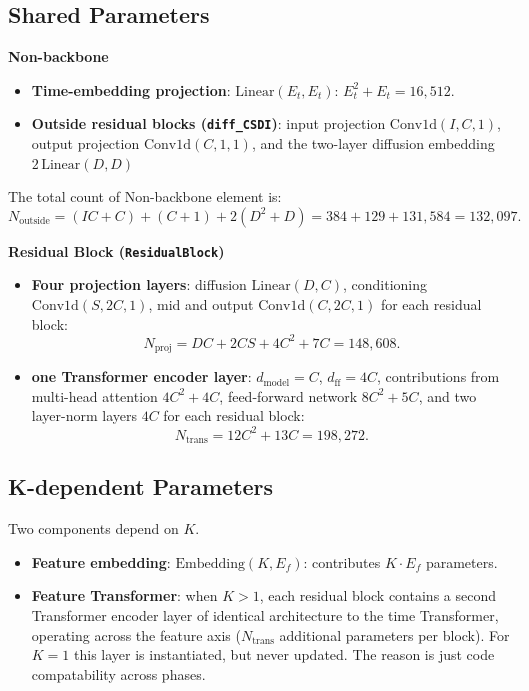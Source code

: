 \subsection{Shared Parameters}

\textbf{Non-backbone}
\begin{itemize}
    \item \textbf{Time-embedding projection}: $\mathrm{Linear}(E_t, E_t)$: \(E_t^2 + E_t = 16{,}512.\)
    \item \textbf{Outside residual blocks (\texttt{diff\_CSDI})}: input projection $\mathrm{Conv1d}(I,C,1)$, output projection $\mathrm{Conv1d}(C,1,1)$, and the two-layer diffusion embedding $2\,\mathrm{Linear}(D,D)$
\end{itemize}
The total count of Non-backbone element is:
\[
N_{\mathrm{outside}}
= (IC+C) + (C+1) + 2(D^2+D)
= 384 + 129 + 131{,}584
= 132{,}097.
\]

\textbf{Residual Block (\texttt{ResidualBlock})}
\begin{itemize}
    \item \textbf{Four projection layers}: diffusion $\mathrm{Linear}(D,C)$, conditioning $\mathrm{Conv1d}(S,2C,1)$, mid and output $\mathrm{Conv1d}(C,2C,1)$ for each residual block:
\[
N_{\mathrm{proj}}
= DC + 2CS + 4C^2 + 7C
= 148{,}608.
\]
    \item \textbf{one Transformer encoder layer}: $d_{\mathrm{model}}=C$, $d_{\mathrm{ff}}=4C$, contributions from multi-head attention $4C^2+4C$, feed-forward network $8C^2+5C$, and two layer-norm layers $4C$ for each residual block:
\[
N_{\mathrm{trans}}
= 12C^2 + 13C
= 198{,}272.
\]
\end{itemize}

\subsection{K-dependent Parameters}

Two components depend on $K$.
\begin{itemize}
    \item \textbf{Feature embedding}: $\mathrm{Embedding}(K,E_f)$: contributes $K\cdot E_f$ parameters.
    \item \textbf{Feature Transformer}: when $K>1$, each residual block contains a second Transformer encoder layer of identical architecture to the time Transformer, operating across the feature axis ($N_{\mathrm{trans}}$ additional parameters per block). For $K=1$ this layer is instantiated, but never updated. The reason is just code compatability across phases. 
\end{itemize}

